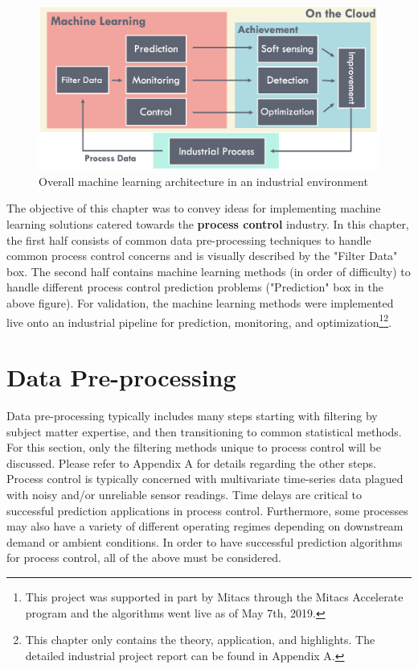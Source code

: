 \begin{figure}[h]
    \centering
    \includegraphics[width=\textwidth]{images/ch2/02AICloud.png}
    \caption{Overall machine learning architecture in an industrial environment}
    \label{fig:02AICloud}
\end{figure}

The objective of this chapter was to convey ideas for implementing machine learning solutions catered towards the \textbf{process control} industry.  In this chapter, the first half consists of common data pre-processing techniques to handle common process control concerns and is visually described by the "Filter Data" box.  The second half contains machine learning methods (in order of difficulty) to handle different process control prediction problems ("Prediction" box in the above figure). For validation, the machine learning methods were implemented live onto an industrial pipeline for prediction, monitoring, and optimization\footnote{This project was supported in part by Mitacs through the Mitacs Accelerate program and the algorithms went live as of May 7th, 2019.}\footnote{This chapter only contains the theory, application, and highlights. The detailed industrial project report can be found in Appendix A.}.

\section{Data Pre-processing}
Data pre-processing typically includes many steps starting with filtering by subject matter expertise, and then transitioning to common statistical methods.  For this section, only the filtering methods unique to process control will be discussed. Please refer to Appendix A for details regarding the other steps. Process control is typically concerned with multivariate time-series data plagued with noisy and/or unreliable sensor readings. Time delays are critical to successful prediction applications in process control. Furthermore, some processes may also have a variety of different operating regimes depending on downstream demand or ambient conditions.  In order to have successful prediction algorithms for process control, all of the above must be considered.

